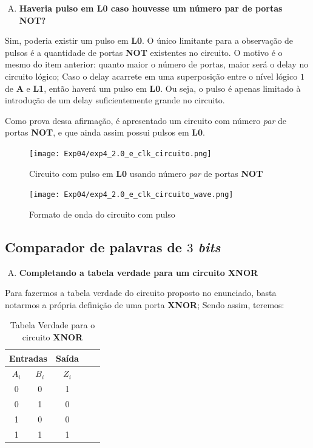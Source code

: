 \documentclass[12pt]{article}
\begin{document}
\begin{enumerate}[E)]
\item \textbf{Haveria pulso em L0 caso houvesse um número par de portas NOT?}
\end{enumerate}

Sim, poderia existir um pulso em \textbf{L0}. O único limitante para a
observação de pulsos é a quantidade de portas \textbf{NOT} existentes no
circuito. O motivo é o mesmo do item anterior: quanto maior o número de portas,
maior será o delay no circuito lógico; Caso o delay acarrete em uma superposição
entre o nível lógico $1$ de \textbf{A} e \textbf{L1}, então haverá um pulso em
\textbf{L0}. Ou seja, o pulso é apenas limitado à introdução de um delay
suficientemente grande no circuito.

Como prova dessa afirmação, é apresentado um circuito com número \emph{par} de
portas \textbf{NOT}, e que ainda assim possui pulsos em \textbf{L0}.

\begin{figure}[H]
    \centering
    \texttt{[image: Exp04/exp4\_2.0\_e\_clk\_circuito.png]}
    \caption{Circuito com pulso em \textbf{L0} usando número \emph{par} de portas \textbf{NOT}}\label{fig:exp4_2.0_e_clk_circuito.png}
\end{figure}

\begin{figure}[H]
    \centering
    \texttt{[image: Exp04/exp4\_2.0\_e\_clk\_circuito\_wave.png]}
    \caption{Formato de onda do circuito com pulso}\label{fig:exp4_2.0_e_clk_circuito_wave.png}
\end{figure}


\subsection{Comparador de palavras de \(3\) \emph{bits}}\label{sec:comparador_de_palavras_3_bits}

\begin{enumerate}[A)]
\item \textbf{Completando a tabela verdade para um circuito \textbf{XNOR}}
\end{enumerate}

Para fazermos a tabela verdade do circuito proposto no enunciado, basta notarmos
a própria definição de uma porta \textbf{XNOR}; Sendo assim, teremos:

\begin{table}[H]
    \centering
    \caption{Tabela Verdade para o circuito \textbf{XNOR}}
    \begin{tabular}{|c|c|c|c|c|}\hline
    \multicolumn{2}{|c|}{Entradas} & \multicolumn{1}{|c|}{Saída} \\\hline
    $A_{i}$ & $B_{i}$ & $Z_{i}$ \\\hline
    0 & 0 & 1 \\\hline
    0 & 1 & 0 \\\hline
    1 & 0 & 0 \\\hline
    1 & 1 & 1 \\\hline
    \end{tabular}\label{tab:comparador_de_palavras_3_bits}
\end{table}
\end{document}
